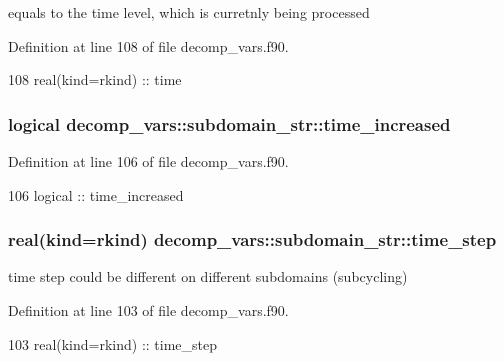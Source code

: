 equals to the time level, which is curretnly being processed 



Definition at line 108 of file decomp\+\_\+vars.\+f90.


\begin{DoxyCode}
108     \textcolor{keywordtype}{real(kind=rkind)} :: time
\end{DoxyCode}
\subsubsection[{time\+\_\+increased}]{\setlength{\rightskip}{0pt plus 5cm}logical decomp\+\_\+vars\+::subdomain\+\_\+str\+::time\+\_\+increased}\label{structdecomp__vars_1_1subdomain__str_aced1dd234556b769526322763bd50cd9}


Definition at line 106 of file decomp\+\_\+vars.\+f90.


\begin{DoxyCode}
106     \textcolor{keywordtype}{logical} :: time\_increased
\end{DoxyCode}
\subsubsection[{time\+\_\+step}]{\setlength{\rightskip}{0pt plus 5cm}real(kind=rkind) decomp\+\_\+vars\+::subdomain\+\_\+str\+::time\+\_\+step}\label{structdecomp__vars_1_1subdomain__str_ac2592ffccabf4b2a9375266413bff638}


time step could be different on different subdomains (subcycling) 



Definition at line 103 of file decomp\+\_\+vars.\+f90.


\begin{DoxyCode}
103     \textcolor{keywordtype}{real(kind=rkind)} :: time_step
\end{DoxyCode}
